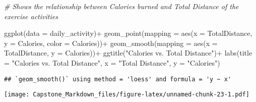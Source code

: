 \documentclass[
]{article}
\newenvironment{Shaded}{\begin{snugshade}}{\end{snugshade}}
\newcommand{\AttributeTok}[1]{\textcolor[rgb]{0.77,0.63,0.00}{#1}}
\newcommand{\CommentTok}[1]{\textcolor[rgb]{0.56,0.35,0.01}{\textit{#1}}}
\newcommand{\FunctionTok}[1]{\textcolor[rgb]{0.00,0.00,0.00}{#1}}
\newcommand{\NormalTok}[1]{#1}
\newcommand{\SpecialCharTok}[1]{\textcolor[rgb]{0.00,0.00,0.00}{#1}}
\newcommand{\StringTok}[1]{\textcolor[rgb]{0.31,0.60,0.02}{#1}}
\begin{document}
\begin{Shaded}
\begin{Highlighting}[]
\CommentTok{\# Shows the relationship between Calories burned and Total Distance of the exercise activities }

\FunctionTok{ggplot}\NormalTok{(}\AttributeTok{data =}\NormalTok{ daily\_activity)}\SpecialCharTok{+}
  \FunctionTok{geom\_point}\NormalTok{(}\AttributeTok{mapping =} \FunctionTok{aes}\NormalTok{(}\AttributeTok{x =}\NormalTok{ TotalDistance, }\AttributeTok{y =}\NormalTok{ Calories, }\AttributeTok{color =}\NormalTok{ Calories))}\SpecialCharTok{+}
  \FunctionTok{geom\_smooth}\NormalTok{(}\AttributeTok{mapping =} \FunctionTok{aes}\NormalTok{(}\AttributeTok{x =}\NormalTok{ TotalDistance, }\AttributeTok{y =}\NormalTok{ Calories))}\SpecialCharTok{+}
  \FunctionTok{ggtitle}\NormalTok{(}\StringTok{"Calories vs. Total Distance"}\NormalTok{)}\SpecialCharTok{+}
  \FunctionTok{labs}\NormalTok{(}\AttributeTok{title =} \StringTok{"Calories vs. Total Distance"}\NormalTok{,}
       \AttributeTok{x =} \StringTok{"Total Distance"}\NormalTok{, }\AttributeTok{y =} \StringTok{"Calories"}\NormalTok{)}
\end{Highlighting}
\end{Shaded}

\begin{verbatim}
## `geom_smooth()` using method = 'loess' and formula = 'y ~ x'
\end{verbatim}

\texttt{[image: Capstone\_Markdown\_files/figure-latex/unnamed-chunk-23-1.pdf]}
\end{document}
